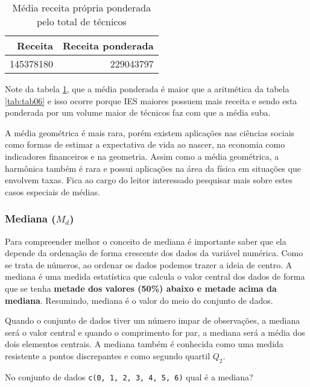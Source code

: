 \documentclass[11pt,]{style/krantz}
\renewenvironment{quote}{\begin{VF}}{\end{VF}}
\theoremstyle{definition}
\theoremstyle{definition}
\theoremstyle{definition}
\theoremstyle{remark}
\let\BeginKnitrBlock\begin \let\EndKnitrBlock\end
\begin{document}
\begin{table}[!h]

\caption{\label{tab:tab07}Média receita própria 
               ponderada pelo total de técnicos}
\centering
\begin{tabular}{r|r}
\hline
Receita & Receita ponderada\\
\hline
145378180 & 229043797\\
\hline
\end{tabular}
\end{table}

Note da tabela \ref{tab:tab07}, que a média ponderada é maior que a aritmética da tabela \ref{tab:tab06} e isso ocorre porque IES maiores possuem mais receita e sendo esta ponderada por um volume maior de técnicos faz com que a média suba.

A média geométrica é mais rara, porém existem aplicações nas ciências sociais como formas de estimar a expectativa de vida ao nascer, na economia como indicadores financeiros e na geometria. Assim como a média geométrica, a harmônica também é rara e possui aplicações na área da física em situações que envolvem taxas. Fica ao cargo do leitor interessado pesquisar mais sobre estes casos especiais de médias.

\hypertarget{mediana-m_d}{%
\subsubsection{\texorpdfstring{Mediana (\(M_d\))}{Mediana (M\_d)}}\label{mediana-m_d}}

Para compreender melhor o conceito de mediana é importante saber que ela depende da ordenação de forma crescente dos dados da variável numérica. Como se trata de números, ao ordenar os dados podemos trazer a ideia de centro. A mediana é uma medida estatística que calcula o valor central dos dados de forma que se tenha \textbf{metade dos valores (50\%) abaixo e metade acima da mediana}. Resumindo, mediana é o valor do meio do conjunto de dados.

\begin{quote}
Quando o conjunto de dados tiver um número impar de observações, a mediana será o valor central e quando o comprimento for par, a mediana será a média dos dois elementos centrais. A mediana também é conhecida como uma medida resistente a pontos discrepantes e como segundo quartil \(Q_2\).
\end{quote}

\BeginKnitrBlock{example}
\protect\hypertarget{exm:unnamed-chunk-50}{}{\label{exm:unnamed-chunk-50} }No conjunto de dados \texttt{c(0,\ 1,\ 2,\ 3,\ 4,\ 5,\ 6)} qual é a mediana?
\EndKnitrBlock{example}
\end{document}
